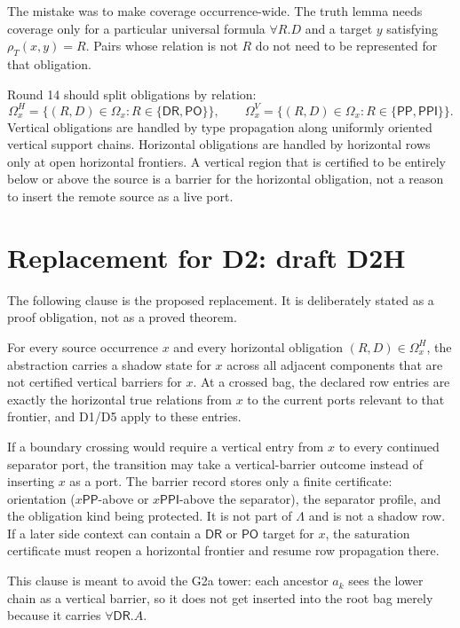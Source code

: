 \documentclass[11pt]{article}
\newcommand{\PP}{\mathsf{PP}}
\newcommand{\PPI}{\mathsf{PPI}}
\newcommand{\PO}{\mathsf{PO}}
\newcommand{\DR}{\mathsf{DR}}
\begin{document}
The mistake was to make coverage occurrence-wide.  The truth lemma needs
coverage only for a particular universal formula $\forall R.D$ and a target
$y$ satisfying $\rho_T(x,y)=R$.  Pairs whose relation is not $R$ do not need to
be represented for that obligation.

Round 14 should split obligations by relation:
\[
\Omega_x^H=\{(R,D)\in\Omega_x:R\in\{\DR,\PO\}\},
\qquad
\Omega_x^V=\{(R,D)\in\Omega_x:R\in\{\PP,\PPI\}\}.
\]
Vertical obligations are handled by type propagation along uniformly oriented
vertical support chains.  Horizontal obligations are handled by horizontal rows
only at open horizontal frontiers.  A vertical region that is certified to be
entirely below or above the source is a barrier for the horizontal obligation,
not a reason to insert the remote source as a live port.

\section{Replacement for D2: draft D2H}

The following clause is the proposed replacement.  It is deliberately stated as
a proof obligation, not as a proved theorem.

\begin{description}[leftmargin=2em]
\item[(D2H) Horizontal-frontier propagation with vertical barriers.]
For every source occurrence $x$ and every horizontal obligation
$(R,D)\in\Omega_x^H$, the abstraction carries a shadow state for $x$ across
all adjacent components that are not certified vertical barriers for $x$.
At a crossed bag, the declared row entries are exactly the horizontal true
relations from $x$ to the current ports relevant to that frontier, and D1/D5
apply to these entries.

If a boundary crossing would require a vertical entry from $x$ to every
continued separator port, the transition may take a vertical-barrier outcome
instead of inserting $x$ as a port.  The barrier record stores only a finite
certificate: orientation ($x\PP$-above or $x\PPI$-above the separator), the
separator profile, and the obligation kind being protected.  It is not part of
$\Lambda$ and is not a shadow row.  If a later side context can contain a
$\DR$ or $\PO$ target for $x$, the saturation certificate must reopen a
horizontal frontier and resume row propagation there.
\end{description}

This clause is meant to avoid the G2a tower: each ancestor $a_k$ sees the lower
chain as a vertical barrier, so it does not get inserted into the root bag
merely because it carries $\forall\DR.A$.
\end{document}

